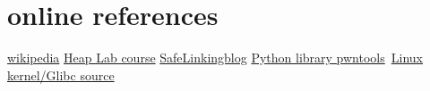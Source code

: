 \documentclass{report}
\begin{document}
    \section{online references}
    \href{https://it.wikipedia.org/wiki/Home_page}{wikipedia}\newline
    \href{https://it.wikipedia.org/wiki/Home_page}{Heap Lab course}\newline
    \href{https://www.researchinnovations.com/post/bypassing-the-upcoming-safe-linking-mitigation}{SafeLinkingblog}\newline 
    \href{https://docs.pwntools.com/en/stable/}{Python library pwntools}\newline\
    \href{https://elixir.bootlin.com/}{Linux kernel/Glibc source}\newline
    \clearpage
\end{document}
